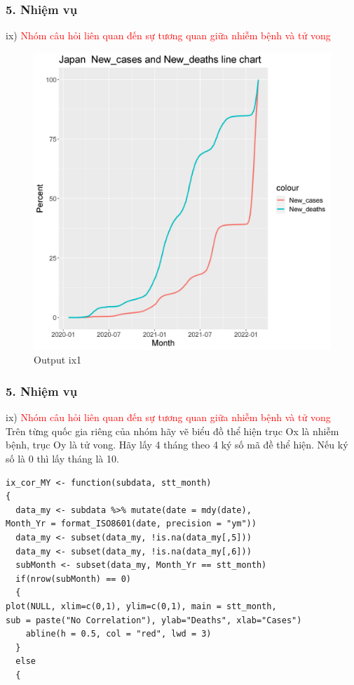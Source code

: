 \documentclass[english,10pt,table]{beamer}
\begin{document}
\begin{frame}[fragile]
\frametitle{5.  Nhiệm vụ}
ix) \textcolor{red}{Nhóm câu hỏi liên quan đến sự tương quan giữa nhiễm bệnh và tử vong}\\
	\begin{figure}[h!]
	\begin{center}
		    \includegraphics[scale = 0.3]{Images/IX/ix1Japan.jpeg}
		     \caption{Output ix1}
		\end{center}
		\end{figure}
\end{frame}

\begin{frame}[fragile]
\frametitle{5.  Nhiệm vụ}
ix) \textcolor{red}{Nhóm câu hỏi liên quan đến sự tương quan giữa nhiễm bệnh và tử vong}\\
 Trên từng quốc gia riêng của nhóm hãy vẽ biểu đồ thể hiện trục Ox là nhiễm bệnh, trục Oy là tử vong. Hãy lấy 4 tháng theo 4 ký số mã đề thể hiện. Nếu ký số là 0 thì lấy tháng là 10.
        \lstset{
    title=Function and Prep for ix 2-3}
\begin{lstlisting}[frame=single,basicstyle=\tiny]  
ix_cor_MY <- function(subdata, stt_month)
{
  data_my <- subdata %>% mutate(date = mdy(date),
Month_Yr = format_ISO8601(date, precision = "ym"))
  data_my <- subset(data_my, !is.na(data_my[,5]))
  data_my <- subset(data_my, !is.na(data_my[,6]))
  subMonth <- subset(data_my, Month_Yr == stt_month)
  if(nrow(subMonth) == 0)
  {
plot(NULL, xlim=c(0,1), ylim=c(0,1), main = stt_month, 
sub = paste("No Correlation"), ylab="Deaths", xlab="Cases")
    abline(h = 0.5, col = "red", lwd = 3)
  }
  else
  {
\end{lstlisting}
\end{frame}
\end{document}
